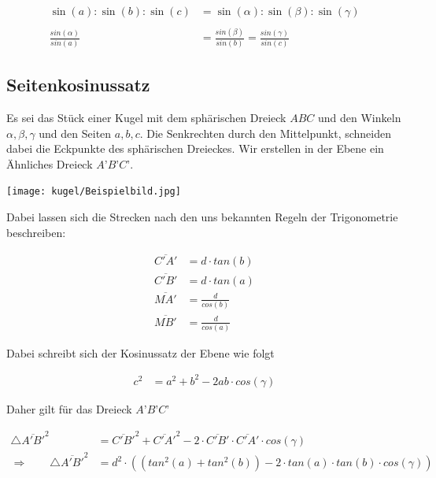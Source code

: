 \begin{refsection}
\begin{satz}
\label{skript:kugel:satz:Sinussatz}
\end{satz}

\begin{align*}
\sin(a) : \sin(b) : \sin(c) &= \sin(\alpha) : \sin(\beta) : \sin(\gamma) \\
 \\
\frac{sin(\alpha)}{sin(a)} &= \frac{sin(\beta)}{sin(b)} = \frac{sin(\gamma)}{sin(c)}
\end{align*} 


\subsection{Seitenkosinussatz}

Es sei das Stück einer Kugel mit dem sphärischen Dreieck $ABC$ und den Winkeln $\alpha, \beta, \gamma$ und den Seiten $a, b, c$. Die Senkrechten durch den Mittelpunkt, schneiden dabei die Eckpunkte des sphärischen Dreieckes. Wir erstellen in der Ebene ein Ähnliches Dreieck $A’B’C’$.

\begin{center}
        \texttt{[image: kugel/Beispielbild.jpg]}
\end{center}

Dabei lassen sich die Strecken nach den uns bekannten Regeln der Trigonometrie beschreiben:

\begin{align*}
\overline{C'A'} &= d\cdot {tan(b)} \\
\overline{C'B'} &= d\cdot {tan(a)} \\
\overline{MA'} &= \frac{ d }{cos(b)} \\
\overline{MB'} &= \frac{ d }{cos(a)}
\end{align*} 

Dabei schreibt sich der Kosinussatz der Ebene wie folgt

\begin{align*}
c^{ 2 } &= a^{ 2 } + b^{ 2 } - 2ab \cdot cos(\gamma)
\end{align*}

Daher gilt für das Dreieck $A’B’C’$

\begin{align*}
\triangle \overline{A'B'}^{ 2 } &= \overline{ C'B' }^{ 2 } + \overline{ C'A' }^{ 2 } - 2 \cdot \overline{C'B'} \cdot \overline{ C'A' } \cdot cos(\gamma) \\
\Rightarrow \quad \quad
\triangle \overline{A'B'}^{ 2 } &= d^{ 2 } \cdot \left(\left(tan^{ 2 }(a) + tan^{ 2 }(b)\right) - 2\cdot tan(a) \cdot tan(b) \cdot cos(\gamma)\right)
\end{align*}



\end{refsection}

